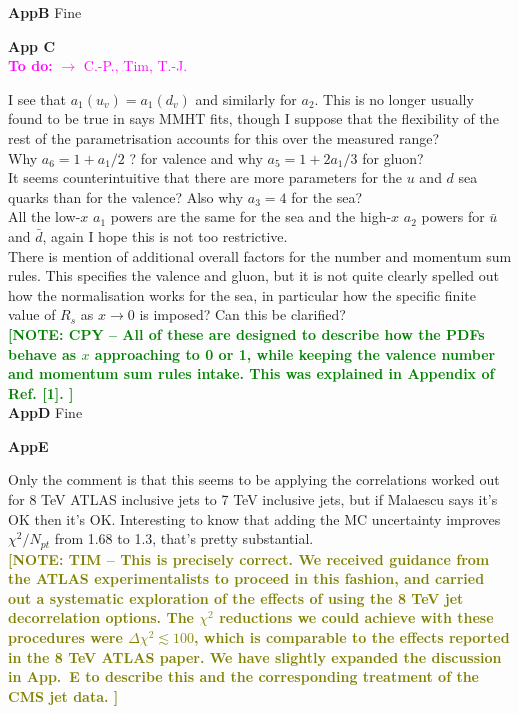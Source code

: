 \documentclass[aps,prd,amsmath,nofootinbib,floatfix,fleqn]{revtex4}
\newcommand{\TODO}[1]{\textcolor{magenta}{
\quad\vspace{3pt} \\ {\bf To do:} #1 \\
}}
\newcommand{\NOTECPY}[1]{\textcolor{green}{ \bf[NOTE: CPY -- #1 ]}}
\newcommand{\NOTETIM}[1]{\textcolor{olive}{ \bf[NOTE: TIM -- #1 ]}}
\begin{document}
{\bf AppB}
Fine


{\bf App C}
\TODO{$\to$ C.-P., Tim, T.-J.}

I see that $a_1(u_v)=a_1(d_v)$ and similarly for $a_2$. This is no longer usually found to be true in says MMHT fits, though I suppose that the flexibility of the rest of the parametrisation accounts for this over the measured range?  \\


\noindent 
Why $a_6=1+a_1/2$ ? for valence and why $a_5=1+2a_1/3$ for gluon?  \\


\noindent 
It seems counterintuitive that there are more parameters for the $u$ and $d$ sea quarks than for the valence? Also why $a_3=4$ for the sea?  \\


\noindent 
All the low-$x$ $a_1$ powers are the same for the sea and the high-$x$ $a_2$ powers for $\bar u$ and $\bar d$, again I hope this is not too restrictive.  \\


\noindent 
There is mention of additional overall factors for the number and momentum sum rules. This specifies
the valence and gluon, but it is not quite clearly spelled out how the normalisation works for the sea, in particular how the specific finite value of $R_s$ as $x \to 0$ is imposed? Can this be clarified?\\
\NOTECPY{All of these are designed to describe how the PDFs behave as $x$ approaching to  0 or 1, while keeping the valence number and momentum sum rules intake. This was explained in Appendix of Ref. [1].}\\



{\bf AppD}
Fine


{\bf AppE}


Only the comment is that this seems to be applying the correlations worked out for 8 TeV ATLAS inclusive jets to 7 TeV inclusive jets, but if Malaescu says it’s OK then it’s OK. Interesting to know that adding the MC uncertainty improves $\chi^2/N_{pt}$ from 1.68 to 1.3, that’s pretty substantial.\\
%
%
\NOTETIM{This is precisely correct. We received guidance from the ATLAS experimentalists
to proceed in this fashion, and carried out a systematic exploration of the effects of using
the 8 TeV jet decorrelation options. The $\chi^2$ reductions we could achieve with these
procedures were $\Delta \chi^2 \lesssim 100$, which is comparable to the effects reported
in the 8 TeV ATLAS paper.  We have slightly expanded the discussion in App.~E to describe
this and the corresponding treatment of the CMS jet data.}\\
\end{document}
